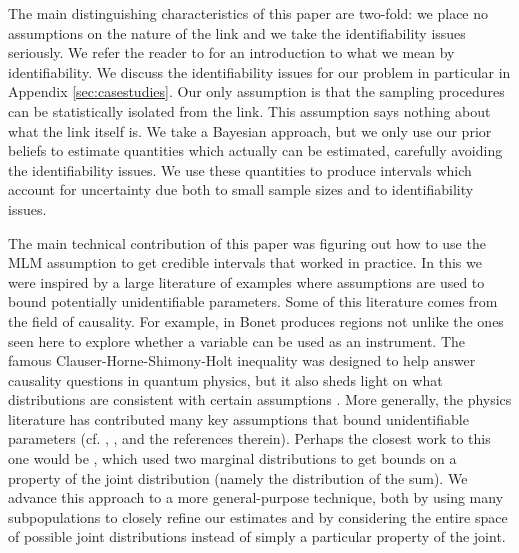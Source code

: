 The main distinguishing characteristics of this paper are two-fold: we place no assumptions on the nature of the link and we take the identifiability issues seriously.  We refer the reader to \cite{walter2014identifiability} for an introduction to what we mean by identifiability.  We discuss the identifiability issues for our problem in particular in Appendix \ref{sec:casestudies}.  Our only assumption is that the sampling procedures can be statistically isolated from the link.  This assumption says nothing about what the link itself is.  We take a Bayesian approach, but we only use our prior beliefs to estimate quantities which actually can be estimated, carefully avoiding the identifiability issues.  We use these quantities to produce intervals which account for uncertainty due both to small sample sizes and to identifiability issues.

The main technical contribution of this paper was figuring out how to use the MLM assumption to get credible intervals that worked in practice.  In this we were inspired by a large literature of examples where assumptions are used to bound potentially unidentifiable parameters.  Some of this literature comes from the field of causality.  For example, in \cite{bonet2001instrumentality} Bonet produces regions not unlike the ones seen here to explore whether a variable can be used as an instrument.  The famous Clauser-Horne-Shimony-Holt inequality was designed to help answer causality questions in quantum physics, but it also sheds light on what distributions are consistent with certain assumptions \cite{clauser1969proposed}.  More generally, the physics literature has contributed many key assumptions that bound unidentifiable parameters (cf. \cite{chaves2014inferring}, \cite{kela2017semidefinite}, and the references therein).  Perhaps the closest work to this one would be \cite{makarov1982estimates}, which used two marginal distributions to get bounds on a property of the joint distribution (namely the distribution of the sum).  We advance this approach to a more general-purpose technique, both by using many subpopulations to closely refine our estimates and by considering the entire space of possible joint distributions instead of simply a particular property of the joint.  

%                                                    


